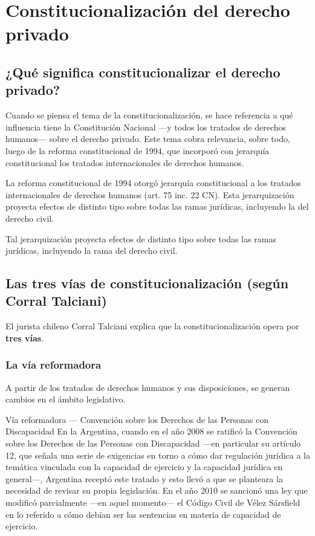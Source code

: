 \documentclass[12pt,oneside]{book}
\begin{document}
\section{Constitucionalización del derecho privado}

\subsection{¿Qué significa constitucionalizar el derecho privado?}

Cuando se piensa el tema de la constitucionalización, se hace referencia a qué influencia tiene la Constitución Nacional —y todos los tratados de derechos humanos— sobre el derecho privado. Este tema cobra relevancia, sobre todo, luego de la reforma constitucional de 1994, que incorporó con jerarquía constitucional los tratados internacionales de derechos humanos.

\begin{important}
La reforma constitucional de 1994 otorgó jerarquía constitucional a los tratados internacionales de derechos humanos (art. 75 inc. 22 CN). Esta jerarquización proyecta efectos de distinto tipo sobre todas las ramas jurídicas, incluyendo la del derecho civil.
\end{important}

Tal jerarquización proyecta efectos de distinto tipo sobre todas las ramas jurídicas, incluyendo la rama del derecho civil.

\subsection{Las tres vías de constitucionalización (según Corral Talciani)}

El jurista chileno Corral Talciani explica que la constitucionalización opera por \textbf{tres vías}.

\subsubsection{La vía reformadora}

A partir de los tratados de derechos humanos y sus disposiciones, se generan cambios en el ámbito legislativo.

\begin{example}{Vía reformadora — Convención sobre los Derechos de las Personas con Discapacidad}
En la Argentina, cuando en el año 2008 se ratificó la Convención sobre los Derechos de las Personas con Discapacidad —en particular su artículo 12, que señala una serie de exigencias en torno a cómo dar regulación jurídica a la temática vinculada con la capacidad de ejercicio y la capacidad jurídica en general—, Argentina receptó este tratado y esto llevó a que se planteara la necesidad de revisar su propia legislación. En el año 2010 se sancionó una ley que modificó parcialmente —en aquel momento— el Código Civil de Vélez Sársfield en lo referido a cómo debían ser las sentencias en materia de capacidad de ejercicio.
\end{example}
\end{document}

